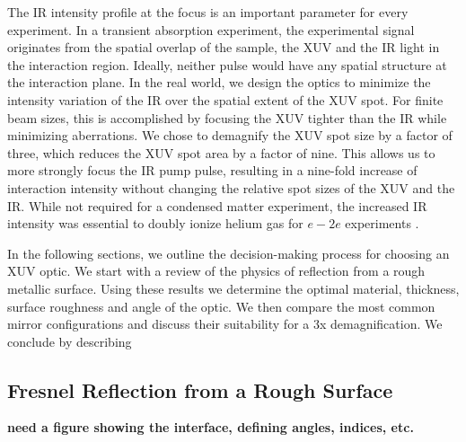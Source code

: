The IR intensity profile at the focus is an important parameter for every experiment. In a transient absorption experiment, the experimental signal originates from the spatial overlap of the sample, the XUV and the IR light in the interaction region. Ideally, neither pulse would have any spatial structure at the interaction plane. In the real world, we design the optics to minimize the intensity variation of the IR over the spatial extent of the XUV spot. For finite beam sizes, this is accomplished by focusing the XUV tighter than the IR while minimizing aberrations. We chose to demagnify the XUV spot size by a factor of three, which reduces the XUV spot area by a factor of nine. This allows us to more strongly focus the IR pump pulse, resulting in a nine-fold increase of interaction intensity without changing the relative spot sizes of the XUV and the IR. While not required for a condensed matter experiment, the increased IR intensity was essential to doubly ionize helium gas for $e-2e$ experiments \cite{kiesewetterDynamicsNearThresholdAttosecond2019}.

In the following sections, we outline the decision-making process for choosing an XUV optic. We start with a review of the physics of reflection from a rough metallic surface. Using these results we determine the optimal material, thickness, surface roughness and angle of the optic. We then compare the most common mirror configurations and discuss their suitability for a 3x demagnification. We conclude by describing 

\subsection{Fresnel Reflection from a Rough Surface}

\textbf{need a figure showing the interface, defining angles, indices, etc.}

